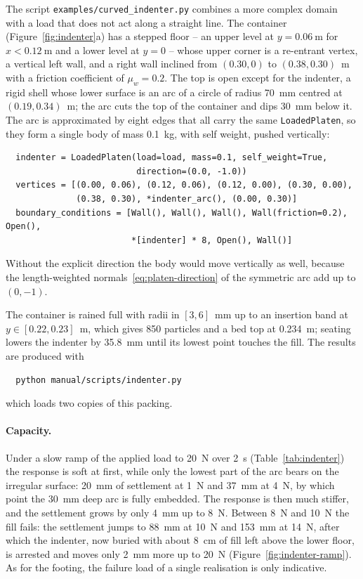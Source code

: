 The script \texttt{examples/curved\_indenter.py} combines a more complex domain
with a load that does not act along a straight line.  The container
(Figure~\ref{fig:indenter}a) has a stepped floor -- an upper level at
$y=\qty{0.06}{\metre}$ for $x<\qty{0.12}{\metre}$ and a lower level at $y=0$ --
whose upper corner is a re-entrant vertex, a vertical left wall, and a right
wall inclined from $(0.30,0)$ to $(0.38,0.30)$~\unit{\metre} with a friction
coefficient of $\mu_{w}=0.2$.  The top is open except for the indenter, a rigid
shell whose lower surface is an arc of a circle of radius \qty{70}{\milli\metre}
centred at $(0.19,0.34)$~\unit{\metre}; the arc cuts the top of the container
and dips \qty{30}{\milli\metre} below it.  The arc is approximated by eight
edges that all carry the same \texttt{LoadedPlaten}, so they form a single body
of mass \qty{0.1}{\kilogram}, with self weight, pushed vertically:
\begin{verbatim}
  indenter = LoadedPlaten(load=load, mass=0.1, self_weight=True,
                          direction=(0.0, -1.0))
  vertices = [(0.00, 0.06), (0.12, 0.06), (0.12, 0.00), (0.30, 0.00),
              (0.38, 0.30), *indenter_arc(), (0.00, 0.30)]
  boundary_conditions = [Wall(), Wall(), Wall(), Wall(friction=0.2), Open(),
                         *[indenter] * 8, Open(), Wall()]
\end{verbatim}
Without the explicit direction the body would move vertically as well, because
the length-weighted normals~\eqref{eq:platen-direction} of the symmetric arc add
up to $(0,-1)$.

The container is rained full with radii in $[3,6]$~\unit{\milli\metre} up to an
insertion band at $y\in[0.22,0.23]$~\unit{\metre}, which gives \num{850}
particles and a bed top at \qty{0.234}{\metre}; seating lowers the indenter by
\qty{35.8}{\milli\metre} until its lowest point touches the fill.  The results
are produced with
\begin{verbatim}
  python manual/scripts/indenter.py
\end{verbatim}
which loads two copies of this packing.

\paragraph{Capacity.}  Under a slow ramp of the applied load to
\qty{20}{\newton} over \qty{2}{\second} (Table~\ref{tab:indenter}) the response
is soft at first, while only the lowest part of the arc bears on the irregular
surface: \qty{20}{\milli\metre} of settlement at \qty{1}{\newton} and
\qty{37}{\milli\metre} at \qty{4}{\newton}, by which point the
\qty{30}{\milli\metre} deep arc is fully embedded.  The response is then much
stiffer, and the settlement grows by only \qty{4}{\milli\metre} up to
\qty{8}{\newton}.  Between \qty{8}{\newton} and \qty{10}{\newton} the fill fails:
the settlement jumps to \qty{88}{\milli\metre} at \qty{10}{\newton} and
\qty{153}{\milli\metre} at \qty{14}{\newton}, after which the indenter, now
buried with about \qty{8}{\centi\metre} of fill left above the lower floor, is
arrested and moves only \qty{2}{\milli\metre} more up to \qty{20}{\newton}
(Figure~\ref{fig:indenter-ramp}).  As for the footing, the failure load of a
single realisation is only indicative.

